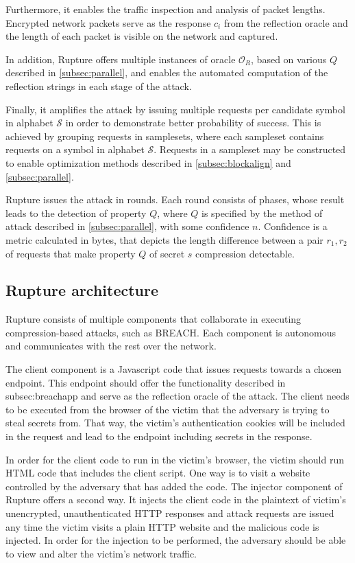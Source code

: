 \documentclass{sig-alternate-05-2015}
\begin{document}
Furthermore, it enables the traffic inspection and analysis of packet
lengths. Encrypted network packets serve as the response $c_i$ from the
reflection oracle and the length of each packet is visible on the network and
captured.

In addition, Rupture offers multiple instances of oracle $\mathcal{O}_R$, based
on various $Q$ described in \ref{subsec:parallel}, and enables the automated
computation of the reflection strings in each stage of the attack.

Finally, it amplifies the attack by issuing multiple requests per candidate
symbol in alphabet $\mathcal{S}$ in order to demonstrate better probability of
success. This is achieved by grouping requests in samplesets, where each
sampleset contains requests on a symbol in alphabet $\mathcal{S}$. Requests in a
sampleset may be constructed to enable optimization methods described in
\ref{subsec:blockalign} and \ref{subsec:parallel}.

Rupture issues the attack in rounds. Each round consists of phases, whose result
leads to the detection of property $Q$, where $Q$ is specified by the method of
attack described in \ref{subsec:parallel}, with some confidence $n$. Confidence
is a metric calculated in bytes, that depicts the length difference between a
pair $r_1, r_2$ of requests that make property $Q$ of secret $s$ compression
detectable.

\subsection{Rupture architecture}\label{app:rupture}
Rupture consists of multiple components that collaborate in executing
compression-based attacks, such as BREACH. Each component is autonomous and
communicates with the rest over the network.

The client component is a Javascript code that issues requests towards a chosen
endpoint. This endpoint should offer the functionality described in
{subsec:breachapp} and serve as the reflection oracle of the attack. The client
needs to be executed from the browser of the victim that the adversary is trying
to steal secrets from. That way, the victim's authentication cookies will be
included in the request and lead to the endpoint including secrets in the
response.

In order for the client code to run in the victim's browser, the victim should
run HTML code that includes the client script. One way is to visit a website
controlled by the adversary that has added the code. The injector component of
Rupture offers a second way. It injects the client code in the plaintext of
victim's unencrypted, unauthenticated HTTP responses and attack requests are
issued any time the victim visits a plain HTTP website and the malicious code is
injected. In order for the injection to be performed, the adversary should be
able to view and alter the victim's network traffic.
\end{document}
